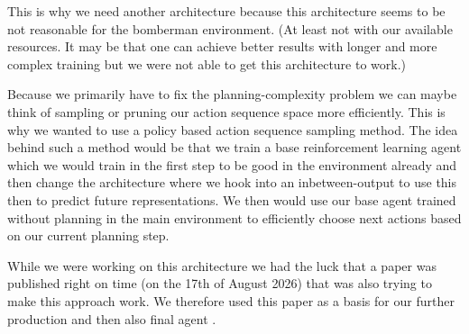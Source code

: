 \documentclass[article, 10pt]{IEEEtran}
\begin{document}
This is why we need another architecture because this architecture seems to be not reasonable for the bomberman environment. (At least not with our available resources. It may be that one can achieve better results with longer and more complex training but we were not able to get this architecture to work.)

Because we primarily have to fix the planning-complexity problem we can maybe think of sampling or pruning our action sequence space more efficiently. This is why we wanted to use a policy based action sequence sampling method. The idea behind such a method would be that we train a base reinforcement learning agent which we would train in the first step to be good in the environment already and then change the architecture where we hook into an inbetween-output to use this then to predict future representations. We then would use our base agent trained without planning in the main environment to efficiently choose next actions based on our current planning step.

While we were working on this architecture we had the luck that a paper was published right on time (on the 17th of August 2026) that was also trying to make this approach work. We therefore used this paper as a basis for our further production and then also final agent \cite{dong2026qwm}.


\end{document}
